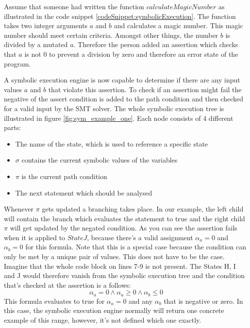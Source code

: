 Assume that someone had written the function $calculateMagicNumber$ as illustrated in the code snippet \ref{codeSnippet:symbolicExecution}. The function takes two integer arguments $a$ and $b$ and calculates a magic number. This magic number should meet certain criteria. Amongst other things, the number $b$ is divided by a mutated $a$. Therefore the person added an assertion which checks that $a$ is not $0$ to prevent a division by zero and therefore an error state of the program.

A symbolic execution engine is now capable to determine if there are any input values $a$  and $b$ that violate this assertion. To check if an assertion might fail the negative of the assert condition is added to the path condition and then checked for a valid input by the SMT solver. The whole symbolic execution tree is illustrated in figure \ref{fig:sym_example_one}. Each node consists of 4 different parts:
\begin{itemize}
\item The name of the state, which is used to reference a specific state
\item $\sigma$ contains the current symbolic values of the variables
\item $\pi$ is the current path condition
\item The next statement which should be analysed
\end{itemize}
Whenever $\pi$ gets updated a branching takes place. In our example, the left child will contain the branch which evaluates the statement to true and the right child $\pi$ will get updated by the negated condition.
As you can see the assertion fails when it is applied to $State J$, because there's a valid assignment $\alpha_a = 0$ and $\alpha_b = 0$ for this formula. Note that this is a special case because the condition can only be met by a unique pair of values. This does not have to be the case. Imagine that the whole code block on lines 7-9 is not present. The States H, I and J would therefore vanish from the symbolic execution tree and the condition that's checked at the assertion is a follows:
$$\alpha_a  = 0 \land \alpha_a \geq 0 \land \alpha_b \leq 0$$
This formula evaluates to true for $\alpha_a = 0$  and any $\alpha_b$ that is negative or zero. In this case, the symbolic execution engine normally will return one concrete example of this range, however, it's not defined which one exactly. 
